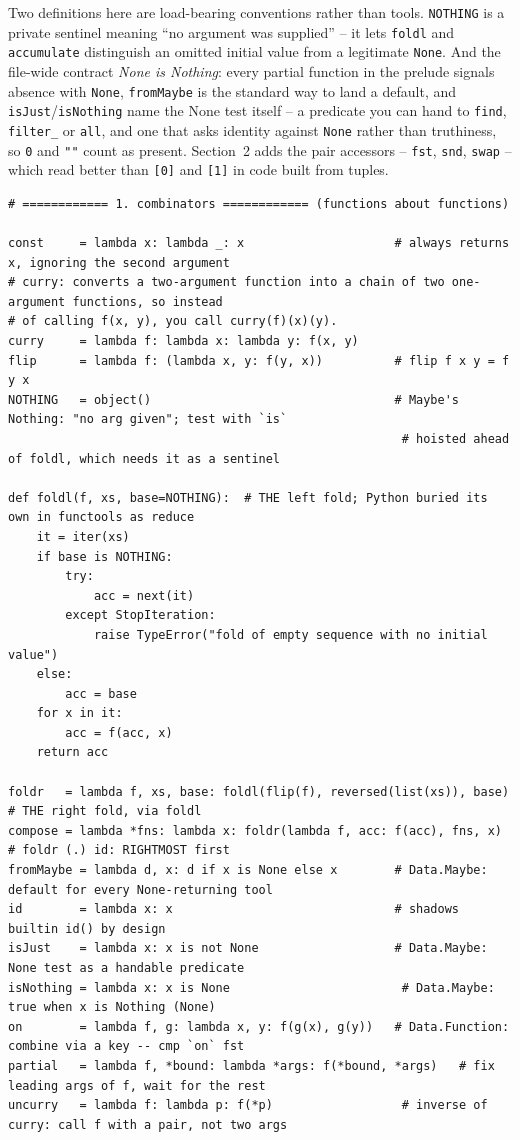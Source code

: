 \documentclass[11pt,letterpaper]{book}
\begin{document}
Two definitions here are load-bearing conventions rather than tools.
\texttt{NOTHING} is a private sentinel meaning ``no argument was supplied'' --
it lets \texttt{foldl} and \texttt{accumulate} distinguish an omitted initial
value from a legitimate \texttt{None}. And the file-wide contract \emph{None is
Nothing}: every partial function in the prelude signals absence with
\texttt{None}, \texttt{fromMaybe} is the standard way to land a default, and
\texttt{isJust}/\texttt{isNothing} name the None test itself -- a predicate
you can hand to \texttt{find}, \texttt{filter\_} or \texttt{all}, and one that
asks identity against \texttt{None} rather than truthiness, so \texttt{0} and
\texttt{""} count as present.
Section~2 adds the pair accessors -- \texttt{fst}, \texttt{snd}, \texttt{swap}
-- which read better than \texttt{[0]} and \texttt{[1]} in code built from
tuples.
\begin{lstlisting}[style=code]
# ============ 1. combinators ============ (functions about functions)

const     = lambda x: lambda _: x                     # always returns x, ignoring the second argument
# curry: converts a two-argument function into a chain of two one-argument functions, so instead
# of calling f(x, y), you call curry(f)(x)(y).
curry     = lambda f: lambda x: lambda y: f(x, y)
flip      = lambda f: (lambda x, y: f(y, x))          # flip f x y = f y x
NOTHING   = object()                                  # Maybe's Nothing: "no arg given"; test with `is`
                                                       # hoisted ahead of foldl, which needs it as a sentinel

def foldl(f, xs, base=NOTHING):  # THE left fold; Python buried its own in functools as reduce
    it = iter(xs)
    if base is NOTHING:
        try:
            acc = next(it)
        except StopIteration:
            raise TypeError("fold of empty sequence with no initial value")
    else:
        acc = base
    for x in it:
        acc = f(acc, x)
    return acc

foldr   = lambda f, xs, base: foldl(flip(f), reversed(list(xs)), base)  # THE right fold, via foldl
compose = lambda *fns: lambda x: foldr(lambda f, acc: f(acc), fns, x)   # foldr (.) id: RIGHTMOST first
fromMaybe = lambda d, x: d if x is None else x        # Data.Maybe: default for every None-returning tool
id        = lambda x: x                               # shadows builtin id() by design
isJust    = lambda x: x is not None                   # Data.Maybe: None test as a handable predicate
isNothing = lambda x: x is None                        # Data.Maybe: true when x is Nothing (None)
on        = lambda f, g: lambda x, y: f(g(x), g(y))   # Data.Function: combine via a key -- cmp `on` fst
partial   = lambda f, *bound: lambda *args: f(*bound, *args)   # fix leading args of f, wait for the rest
uncurry   = lambda f: lambda p: f(*p)                  # inverse of curry: call f with a pair, not two args
\end{lstlisting}
\end{document}
